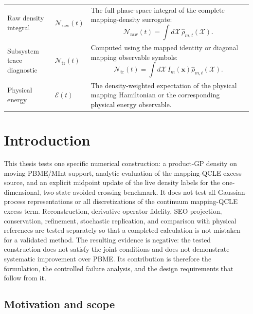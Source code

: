 \documentclass[
  11pt,
  letterpaper,
  onehalfspacing,
  normalmargins,
  equalmargins,
  oneside
]{ut-thesis}
\begin{document}
\begin{longtable}{
@{}
>{\raggedright\arraybackslash}p{}
>{\raggedright\arraybackslash}p{}
>{\raggedright\arraybackslash}p{}
@{}
}
Raw density integral
&
\(\mathcal N_{\mathrm{raw}}(t)\)
&
The full phase-space integral of the complete mapping-density surrogate:
\[
\mathcal N_{\mathrm{raw}}(t)
=
\int
d\boldsymbol{\mathcal X}\,
\widehat\rho_{m,t}
(\boldsymbol{\mathcal X}).
\]
\\

Subsystem trace diagnostic
&
\(\mathcal N_{\mathrm{tr}}(t)\)
&
Computed using the mapped identity or diagonal mapping observable symbols:
\[
\mathcal N_{\mathrm{tr}}(t)
=
\int
d\boldsymbol{\mathcal X}\,
I_m(\mathbf x)
\widehat\rho_{m,t}
(\boldsymbol{\mathcal X}).
\]
\\

Physical energy
&
\(\mathcal E(t)\)
&
The density-weighted expectation of the physical mapping Hamiltonian or
the corresponding physical energy observable.
\\

\end{longtable}

\endgroup

\mainmatter

\chapter{Introduction}
\label{chap:introduction}

This thesis tests one specific numerical construction: a product-GP density on
moving PBME/MInt support, analytic evaluation of the mapping-QCLE excess
source, and an explicit midpoint update of the live density labels for the
one-dimensional, two-state avoided-crossing benchmark. It does not test all
Gaussian-process representations or all discretizations of the continuum
mapping-QCLE excess term. Reconstruction, derivative-operator fidelity, SEO
projection, conservation, refinement, stochastic replication, and comparison
with physical references are tested separately so that a completed calculation
is not mistaken for a validated method.  The resulting evidence is negative:
the tested construction does not satisfy the joint conditions and does not
demonstrate systematic improvement over PBME.  Its contribution is therefore
the formulation, the controlled failure analysis, and the design requirements
that follow from it.

\section{Motivation and scope}
\label{sec:introduction-motivation-scope}
\end{document}
